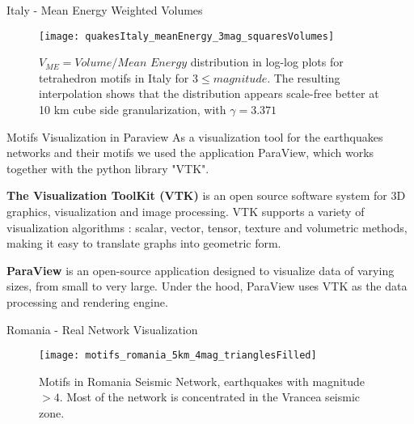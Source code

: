 \begin{frame}{Italy - Mean Energy Weighted Volumes}
\begin{figure}[!h]
  \centering
  \texttt{[image: quakesItaly\_meanEnergy\_3mag\_squaresVolumes]}
\caption{$V_{ME} = Volume/Mean$ $Energy$ distribution in log-log plots for tetrahedron motifs in Italy for $3 \leq magnitude$. The resulting interpolation shows that the distribution appears scale-free  better at 10 km cube side granularization, with $\gamma = 3.371$}
\label{fig:tetrahedronsVolumesItME}
\end{figure}
\end{frame}


{
\begin{frame}{Motifs Visualization in Paraview}
As a visualization tool for the earthquakes networks and their motifs we used the application ParaView, which works together with the python library "VTK".\par

\vspace{5mm}

{\bf The Visualization ToolKit (VTK)} is an open source software system for 3D graphics, visualization and image processing. VTK supports a variety of visualization algorithms : scalar, vector, tensor, texture and volumetric methods, making it easy to translate graphs into geometric form.\par

\vspace{5mm}

{\bf ParaView} is an open-source application designed to visualize data of varying sizes, from small to very large. Under the hood, ParaView uses VTK as the data processing and rendering engine.\par 
\end{frame}
}



\begin{frame}{Romania - Real Network Visualization}
\begin{figure}[!h]
  \centering
  \texttt{[image: motifs\_romania\_5km\_4mag\_trianglesFilled]}
  \caption{Motifs in Romania Seismic Network, earthquakes with magnitude $>4$. Most of the network is concentrated in the Vrancea seismic zone.}
  \label{fig:motifRomania}
\end{figure}
\end{frame}



